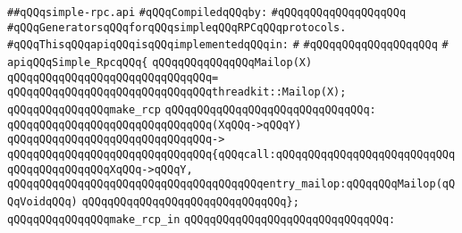 \label{src/lib/src/lib/thread-kit/src/lib/simple-rpc.api}
\verb|##qQQqsimple-rpc.api|\newline
\newline
\verb|#qQQqCompiledqQQqby:|\newline
\verb|#qQQqqQQqqQQqqQQqqQQq|\newline
\newline
\newline
\newline
\newline
\verb|#qQQqGeneratorsqQQqforqQQqsimpleqQQqRPCqQQqprotocols.|\newline
\newline
\newline
\verb|#qQQqThisqQQqapiqQQqisqQQqimplementedqQQqin:|\newline
\verb|#|\newline
\verb|#qQQqqQQqqQQqqQQqqQQq|\newline
\verb|#|\newline
\verb|apiqQQqSimple_RpcqQQq{|\newline
\newline
\verb|qQQqqQQqqQQqqQQqMailop(X)|\newline
\verb|qQQqqQQqqQQqqQQqqQQqqQQqqQQqqQQq=|\newline
\verb|qQQqqQQqqQQqqQQqqQQqqQQqqQQqqQQqthreadkit::Mailop(X);|\newline
\newline
\verb|qQQqqQQqqQQqqQQqmake_rcp|\newline
\verb|qQQqqQQqqQQqqQQqqQQqqQQqqQQqqQQq:|\newline
\verb|qQQqqQQqqQQqqQQqqQQqqQQqqQQqqQQq(XqQQq->qQQqY)|\newline
\verb|qQQqqQQqqQQqqQQqqQQqqQQqqQQqqQQq->|\newline
\verb|qQQqqQQqqQQqqQQqqQQqqQQqqQQqqQQq{qQQqcall:qQQqqQQqqQQqqQQqqQQqqQQqqQQqqQQqqQQqqQQqqQQqXqQQq->qQQqY,|\newline
\verb|qQQqqQQqqQQqqQQqqQQqqQQqqQQqqQQqqQQqqQQqentry_mailop:qQQqqQQqMailop(qQQqVoidqQQq)|\newline
\verb|qQQqqQQqqQQqqQQqqQQqqQQqqQQqqQQq};|\newline
\newline
\verb|qQQqqQQqqQQqqQQqmake_rcp_in|\newline
\verb|qQQqqQQqqQQqqQQqqQQqqQQqqQQqqQQq:|\newline
